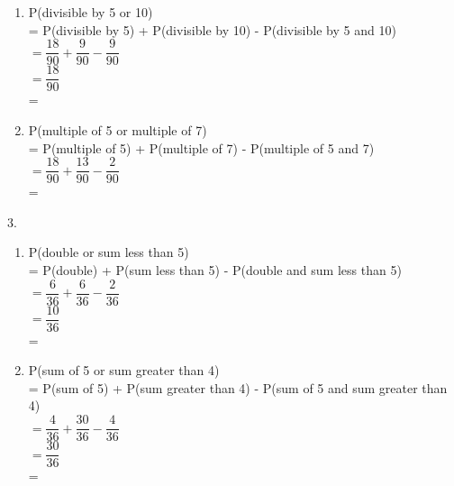 \begin{multicols}{2}
\begin{enumerate}[label = \alph*. ]
\item P(divisible by 5 or 10) \\
= P(divisible by 5) + P(divisible by 10) - P(divisible by 5 and 10)  \redcheck \\
$ = \dfrac{18}{90} + \dfrac{9}{90} - \dfrac{9}{90} $ \redcheck \\
$ = \dfrac{18}{90} $ \redcheck \\
= \redcheck 

\item P(multiple of 5 or multiple of 7) \\
= P(multiple of 5) + P(multiple of 7) - P(multiple of 5 and 7)  \redcheck \\
$ = \dfrac{18}{90} + \dfrac{13}{90} - \dfrac{2}{90} $ \redcheck \\
= \redcheck 
\end{enumerate} 

3. 
\begin{enumerate}[label = \alph*. ]
\item P(double or sum less than 5) \\
= P(double) + P(sum less than 5) - P(double and sum less than 5)  \redcheck \\
$ = \dfrac{6}{36} + \dfrac{6}{36} - \dfrac{2}{36} $ \redcheck \\
$ = \dfrac{10}{36} $ \redcheck \\
= \redcheck 

\item P(sum of 5 or sum greater than 4) \\
= P(sum of 5) + P(sum greater than 4) - P(sum of 5 and sum greater than 4)  \redcheck \\
$ = \dfrac{4}{36} + \dfrac{30}{36} - \dfrac{4}{36} $ \redcheck \\
$ = \dfrac{30}{36} $ \redcheck \\
= \redcheck 


\end{enumerate} 



\end{multicols} 
